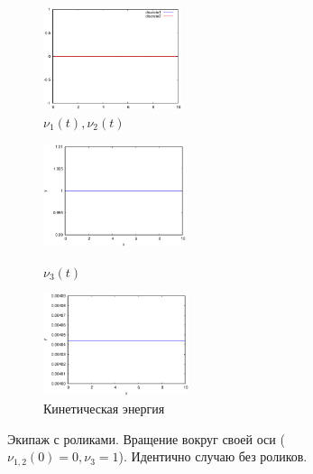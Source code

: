 \begin{figure}
    \begin{subfigure}[t]{0.3\textwidth}
        \centering
        \includegraphics[width=\linewidth, height=30mm]{pic/_sol__0_0_1__0__10__1e2_nu12}
        \caption{$\nu_1(t), \nu_2(t)$}
        \label{fig:_sol__0_0_1__0__10__1e2_nu12}    
    \end{subfigure}
    \hfill
    \begin{subfigure}[t]{0.3\textwidth}
        \centering
        \includegraphics[width=\linewidth, height=30mm]{pic/_sol__0_0_1__0__10__1e2_nu3} \\
        \caption{$\nu_3(t)$}
        \label{fig:_sol__0_0_1__0__10__1e2_nu3}
    \end{subfigure}
    \hfill
    \begin{subfigure}[t]{0.3\textwidth}
        \centering
        \includegraphics[width=\linewidth, height=30mm]{pic/_sol__0_0_1__0__10__1e2_kin_en}
        \caption{Кинетическая энергия}
        \label{fig:_sol__0_0_1__0__10__1e2_kin_en}
    \end{subfigure}
    
    \caption{Экипаж с роликами. Вращение вокруг своей оси ($\nu_{1,2}(0) = 0, \nu_3 = 1$). Идентично случаю без роликов.}
    \label{fig:selfrot}
\end{figure}
